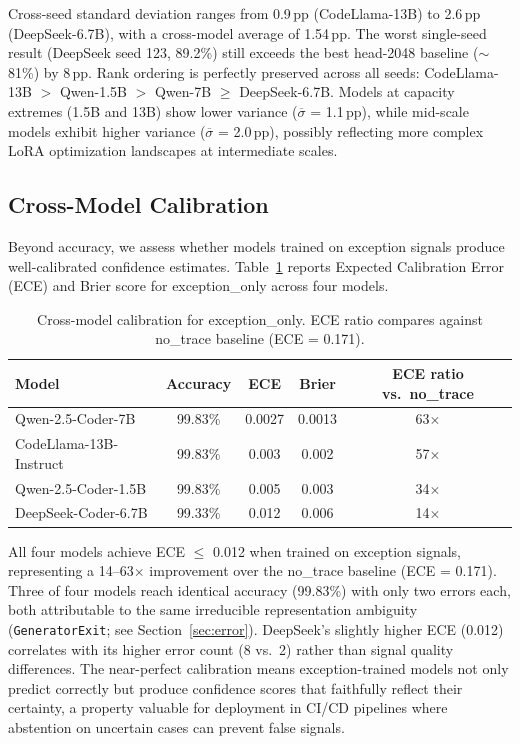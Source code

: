 \documentclass[11pt,a4paper]{article}
\newcommand{\pp}{\,pp}
\begin{document}
Cross-seed standard deviation ranges from 0.9\pp{} (CodeLlama-13B) to 2.6\pp{} (DeepSeek-6.7B), with a cross-model average of 1.54\pp. The worst single-seed result (DeepSeek seed 123, 89.2\%) still exceeds the best head-2048 baseline ($\sim$81\%) by 8\pp. Rank ordering is perfectly preserved across all seeds: CodeLlama-13B $>$ Qwen-1.5B $>$ Qwen-7B $\geq$ DeepSeek-6.7B. Models at capacity extremes (1.5B and 13B) show lower variance ($\overline{\sigma}$ = 1.1\pp), while mid-scale models exhibit higher variance ($\overline{\sigma}$ = 2.0\pp), possibly reflecting more complex LoRA optimization landscapes at intermediate scales.

\subsection{Cross-Model Calibration}
\label{sec:calibration}

Beyond accuracy, we assess whether models trained on exception signals produce well-calibrated confidence estimates. Table~\ref{tab:calibration} reports Expected Calibration Error (ECE) and Brier score for exception\_only across four models.

\begin{table}[t]
\centering
\caption{Cross-model calibration for exception\_only. ECE ratio compares against no\_trace baseline (ECE = 0.171).}
\label{tab:calibration}
\small
\begin{tabular}{@{}lcccc@{}}
\toprule
Model & Accuracy & ECE & Brier & ECE ratio vs.\ no\_trace \\
\midrule
Qwen-2.5-Coder-7B     & 99.83\% & 0.0027 & 0.0013 & 63$\times$ \\
CodeLlama-13B-Instruct & 99.83\% & 0.003  & 0.002  & 57$\times$ \\
Qwen-2.5-Coder-1.5B   & 99.83\% & 0.005  & 0.003  & 34$\times$ \\
DeepSeek-Coder-6.7B    & 99.33\% & 0.012  & 0.006  & 14$\times$ \\
\bottomrule
\end{tabular}
\end{table}

All four models achieve ECE $\leq$ 0.012 when trained on exception signals, representing a 14--63$\times$ improvement over the no\_trace baseline (ECE = 0.171). Three of four models reach identical accuracy (99.83\%) with only two errors each, both attributable to the same irreducible representation ambiguity (\texttt{GeneratorExit}; see Section~\ref{sec:error}). DeepSeek's slightly higher ECE (0.012) correlates with its higher error count (8 vs.\ 2) rather than signal quality differences. The near-perfect calibration means exception-trained models not only predict correctly but produce confidence scores that faithfully reflect their certainty, a property valuable for deployment in CI/CD pipelines where abstention on uncertain cases can prevent false signals.
\end{document}
